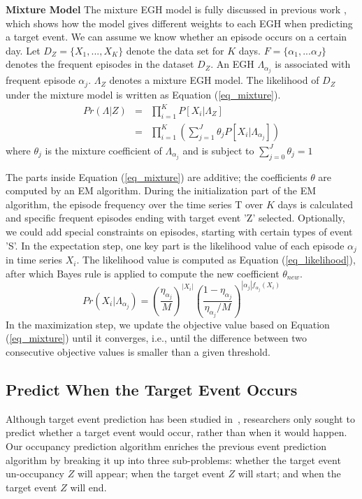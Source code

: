 \textbf{Mixture Model}
The mixture EGH model is fully discussed in previous work \cite{laxman2008stream}, 
which shows how the model 
gives different weights to each EGH
when predicting a target event. 
We can assume we know whether an episode occurs on a certain day. 
Let $D_Z=\{X_1,..., X_K\}$ denote the data set for $K$ days. 
$F=\{\alpha_1, ... \alpha_J\}$ denotes the frequent episodes in the dataset $D_Z$. 
An EGH $\Lambda_{\alpha_j}$ 
is associated with frequent episode $\alpha_j$.
$\Lambda_Z$ denotes a mixture EGH model. 
The likelihood of $D_Z$ under the mixture model is written as Equation (\ref{eq_mixture}).
\begin{eqnarray}
\label{eq_mixture}
Pr(\Lambda|Z) &=& \prod_{i=1}^K P[X_i|\Lambda_Z] \\
			&=& \prod_{i=1}^K ( \sum_{j=1}^J \theta_j P[X_i| \Lambda_{\alpha_j}])
\end{eqnarray}
where $\theta_j$ is the mixture coefficient of $\Lambda_{\alpha_j}$ and is subject to 
$\sum_{j=0}^J \theta_j=1$ 

The parts inside Equation (\ref{eq_mixture}) are additive; 
the coefficients $\theta$ are computed by an EM algorithm. 
%
During the initialization %
part of the EM algorithm, 
the episode frequency over the time series T over $K$ days is calculated and 
specific frequent episodes ending with target event 'Z' selected. 
Optionally, 
we could add special constraints on episodes, starting with 
certain types of event 'S'. 
In the expectation step, 
one key part is the likelihood value of each episode $\alpha_j$ in time series $X_i$.
The likelihood value is computed as Equation (\ref{eq_likelihood}), after which
Bayes rule is applied to compute the new coefficient $\theta_{new}$. 
\begin{equation}
\label{eq_likelihood}
Pr(X_i| \Lambda_{\alpha_j}) = (\frac{\eta_{\alpha_j}}{M})^{|X_i|} (\frac{1-\eta_{\alpha_j}}{\eta_{\alpha_j}/M})^{|\alpha_j|f_{\alpha_j}(X_i)}
\end{equation}
In the maximization step, 
we update the objective value based on Equation (\ref{eq_mixture}) until it converges, i.e., 
until the difference between two consecutive objective values 
is smaller than a given threshold.%


\subsection{Predict When the Target Event Occurs}
Although target event prediction has been studied in~\cite{laxman2008stream},  
researchers only sought to predict whether a target event would occur, 
rather than when it would happen. 
Our occupancy prediction algorithm enriches the previous 
event prediction algorithm by breaking it up into three sub-problems: whether the target event un-occupancy $Z$ will appear; when the target event $Z$ will start; and when the target event $Z$ will end. 

